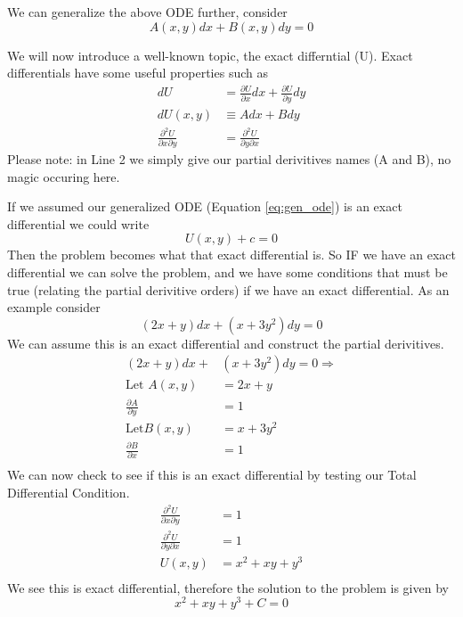 \documentclass{article}
\newcommand{\be}{\begin{equation}}
\newcommand{\ee}{\end{equation}}
\newcommand{\pd}{\partial}
\begin{document}
We can generalize the above ODE further, consider
\be \label{eq:gen_ode}
A(x,y)dx + B(x,y)dy = 0
\ee

We will now introduce a well-known topic, the exact differntial (U). 
Exact differentials have some useful properties such as
\be
\begin{split}
    dU &= \frac{\pd U}{\pd x} dx + \frac{\pd U}{\pd y} dy \\
    dU(x,y) &\equiv A dx + B dy \\
    \frac{\pd ^2 U}{\pd x \pd y} &= \frac{\pd ^2 U}{\pd y \pd x}
\end{split}
\ee
Please note: in Line 2 we simply give our partial derivitives names (A and B), no magic occuring here. 

If we assumed our generalized ODE (Equation \ref{eq:gen_ode}) is an exact differential we could write 
\be
U(x,y) + c = 0
\ee
Then the problem becomes what that exact differential is.
So IF we have an exact differential we can solve the problem, and we have some conditions that must be true (relating the partial derivitive orders) if we have an exact differential.
As an example consider
\be
(2x+y)dx + (x+3y^2)dy = 0
\ee
We can assume this is an exact differential and construct the partial derivitives.
\be
\begin{split}
    (2x+y)dx + &(x+3y^2)dy = 0 \Rightarrow \\
    \text{Let } A(x,y) & = 2x+y  \\
\frac{\partial A}{\partial y} &= 1 \\
    \text{Let} B(x,y) & = x+ 3y^2  \\
\frac{\partial B}{\partial x} &= 1 \\
\end{split}
\ee
We can now check to see if this is an exact differential by testing our Total Differential Condition. 
\be
\begin{split}
    \frac{\pd ^2 U}{\pd x \pd y} &= 1\\
    \frac{\pd ^2 U}{\pd y \pd x} &= 1\\
    U(x,y) &= x^2 + xy + y^3\\
\end{split}
\ee
We see this is exact differential, therefore the solution to the problem is given  by
\be
x^2 + xy + y^3 + C = 0
\ee
\end{document}
